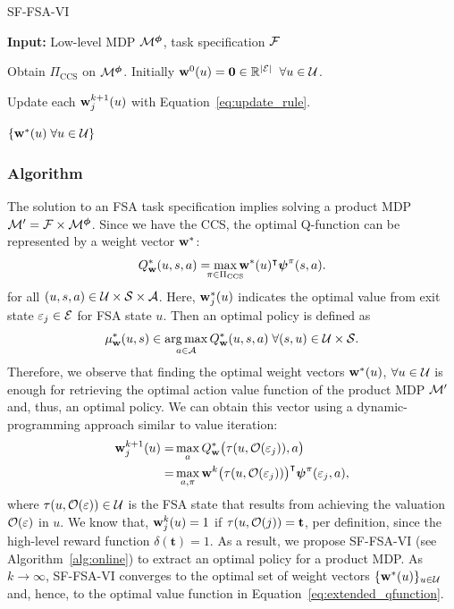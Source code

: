 \begin{algorithm}[!htb]
  \caption{SF-FSA-VI}
  \textbf{Input:} Low-level MDP $\mathcal{M}^{\boldsymbol{\phi}}$, task specification $\mathcal{F}$
  \begin{algorithmic}[1]
    \State Obtain $\Pi_\text{CCS}$ on $\mathcal{M}^{\boldsymbol{\phi}}$.
    \State Initially  $\mathbf{w}^0(u) = \mathbf{0} \in\mathbb{R}^{\lvert\mathcal{E}\rvert}\;\;\forall u\in\mathcal{U}$.
   
        
        \State Update each $\mathbf{w}^{k+1}_j{(u)}$ with Equation~\eqref{eq:update_rule}.
       
      \EndFor
    \EndWhile
    
    \State \Return $\{\mathbf{w}^*(u)\;\forall u\in\mathcal{U}\}$
  \end{algorithmic}
  \label{alg:online}
\end{algorithm}

\subsubsection{Algorithm} 

The solution to an FSA task specification implies solving a product MDP $\mathcal{M}'=\mathcal{F}\times\mathcal{M}^{\boldsymbol{\phi}}$. Since we have the CCS, the optimal Q-function can be represented by a weight vector $\mathbf{w}^*$:
\begin{equation}
    Q^*_\w(u,s,a) = \smashoperator{\max_{\pi\in\Pi_\text{CCS}}} \w^*(u)^{\intercal}\boldsymbol{\psi}^\pi(s,a).
    \label{eq:extended_qfunction}
\end{equation}
for all $(u,s,a)\in\mathcal{U}\times\mathcal{S}\times\mathcal{A}$. Here, $\mathbf{w}_j^*(u)$ indicates the optimal value from exit state $\varepsilon_j\in\mathcal{E}$ for FSA state $u$. Then an optimal policy is defined as
\begin{equation}
    \mu^*_{\mathbf{w}}(u, s) \in \operatorname*{arg\,max}_{a\in\mathcal{A}} Q^*_{\mathbf{w}}(u,s,a)\;\forall(s,u)\in\mathcal{U}\times\mathcal{S}.
    \label{eq:hl-policy}    
\end{equation}
Therefore, we observe that finding the optimal weight vectors $\mathbf{w}^*(u)$, ${\forall u\in\mathcal{U}}$ is enough for retrieving the optimal action value function of the product MDP $\mathcal{M}'$ and, thus, an optimal policy.
 We can obtain this vector using a dynamic-programming approach similar to value iteration: 
\begin{align}
\mathbf{w}_j^{k+1}(u) =&  \max_a Q^*_{\mathbf{w}}\bigl(\tau(u,\mathcal{O}(\varepsilon_j)),a\bigr) \\
              =& 
    \max_{a,\pi} \mathbf{w}^k\bigl(\tau(u,\mathcal{O}(\varepsilon_j))\bigr)^{\intercal} \boldsymbol{\psi}^\pi (\varepsilon_j,a),  
    \label{eq:update_rule}
\end{align}
where $\tau(u,\mathcal{O}(\varepsilon))\in\mathcal{U}$ is the FSA state that results from achieving the valuation $\mathcal{O}(\varepsilon)$ in $u$. We know that, $\mathbf{w}^k_j(u)=1$ if $\tau(u,\mathcal{O}(j))=\textbf{t}$, per definition, since the high-level reward function $\delta(\mathbf{t})=1$. 
As a result, we propose SF-FSA-VI (see Algorithm~\ref{alg:online}) to extract an optimal policy for a product MDP. As $k\rightarrow\infty$, SF-FSA-VI converges to the optimal set of weight vectors $\{\mathbf{w}^*(u)\}_{u\in\mathcal{U}}$ and, hence, to the optimal value function in Equation~\eqref{eq:extended_qfunction}.



